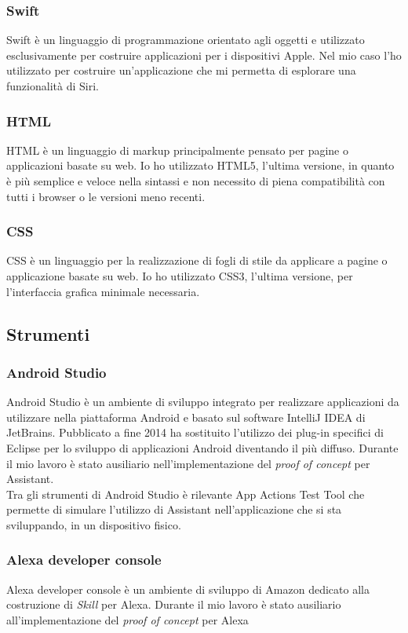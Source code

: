 		\subsubsection{Swift}
		Swift è un linguaggio di programmazione orientato agli oggetti e utilizzato esclusivamente per costruire applicazioni per i dispositivi Apple. Nel mio caso l'ho utilizzato per costruire un'applicazione che mi permetta di esplorare una funzionalità di Siri.
		\subsubsection{HTML}
		HTML è un linguaggio di markup principalmente pensato per pagine o applicazioni basate su web. Io ho utilizzato HTML5, l'ultima versione, in quanto è più semplice e veloce nella sintassi e non necessito di piena compatibilità con tutti i browser o le versioni meno recenti.
		\subsubsection{CSS}
		CSS è un linguaggio per la realizzazione di fogli di stile da applicare a pagine o applicazione basate su web. Io ho utilizzato CSS3, l'ultima versione, per l'interfaccia grafica minimale necessaria.
	\subsection{Strumenti}
		\subsubsection{Android Studio}
		Android Studio è un ambiente di sviluppo integrato per realizzare applicazioni da utilizzare nella piattaforma Android e basato sul software IntelliJ IDEA di JetBrains. Pubblicato a fine 2014 ha sostituito l'utilizzo dei plug-in specifici di Eclipse per lo sviluppo di applicazioni Android diventando il più diffuso. Durante il mio lavoro è stato ausiliario nell'implementazione del \textit{proof of concept} per Assistant. \\
		Tra gli strumenti di Android Studio è rilevante App Actions Test Tool che permette di simulare l'utilizzo di Assistant nell'applicazione che si sta sviluppando, in un dispositivo fisico.
		\subsubsection{Alexa developer console}
		Alexa developer console è un ambiente di sviluppo di Amazon dedicato alla costruzione di \textit{Skill} per Alexa. Durante il mio lavoro è stato ausiliario all'implementazione del \textit{proof of concept} per Alexa
